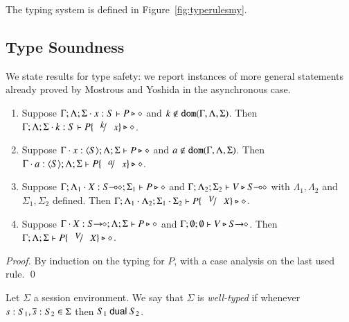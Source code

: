 

The typing system is defined in Figure~\ref{fig:typerulesmy}. 

\subsection{Type Soundness}
We state results for type safety:
we report instances of more general statements already proved by Mostrous and Yoshida in the asynchronous case.

\begin{lemma}\rm
	\begin{enumerate}[1.]
		\item	Suppose $\Gamma; \Lambda; \Sigma \cdot x:S  \vdash P \triangleright \diamond$ and
			$k \not\in \mathtt{dom}(\Gamma, \Lambda, \Sigma)$. 
			Then $\Gamma; \Lambda; \Sigma \cat k:S  \vdash P\subst{k}{x} \hastype \Proc$.

		\item	Suppose $\Gamma \cdot x:\langle S \rangle; \Lambda; \Sigma \vdash P \triangleright \diamond$ and
			$a \not\in \mathtt{dom}(\Gamma, \Lambda, \Sigma)$. 
			Then $\Gamma \cat a:\chtype{S}; \Lambda; \Sigma   \vdash P\subst{a}{x} \hastype \Proc$.

		\item	Suppose $\Gamma; \Lambda_1 \cdot X:S\!\! \multimap\!\! \diamond; \Sigma_1  \vdash P \triangleright \diamond$ 
			and $\Gamma; \Lambda_2; \Sigma_2  \vdash V \triangleright S\!\! \multimap\!\! \diamond$ with 
			$\Lambda_1, \Lambda_2$ and $\Sigma_1, \Sigma_2$ defined.  
			Then $\Gamma; \Lambda_1 \cat \Lambda_2; \Sigma_1 \cat \Sigma_2  \proves P\subst{V}{X} \hastype \Proc$.

		\item	Suppose $\Gamma \cdot X:S\!\! \rightarrow\!\! \diamond; \Lambda; \Sigma  \vdash P \triangleright \diamond$ and
			$\Gamma; \emptyset ; \emptyset  \vdash V \triangleright S\!\! \rightarrow\!\! \diamond$.
			Then $\Gamma; \Lambda; \Sigma  \proves P\subst{V}{X} \hastype \Proc$.
		\end{enumerate}
\end{lemma}

\begin{proof}
By induction on the typing for $P$, with a case analysis on the last used rule. 
\qed
\end{proof}

\begin{definition}\rm
	Let $\Sigma$ a session environment.
	We say that $\Sigma$ is {\em well-typed} if whenever
	$s: S_1, \overline{s}: S_2 \in \Sigma$ then $S_1 \ \mathsf{dual}\  S_2$.
\end{definition}

